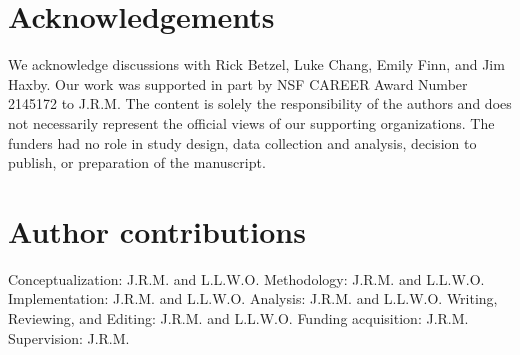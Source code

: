 \documentclass[english, 11pt]{article}
\begin{document}
\section*{Acknowledgements} 

We acknowledge discussions with Rick Betzel, Luke Chang, Emily Finn, and Jim
Haxby. Our work was supported in part by NSF CAREER Award Number 2145172 to
J.R.M. The content is solely the responsibility of the authors and does not
necessarily represent the official views of our supporting organizations. The
funders had no role in study design, data collection and analysis, decision to
publish, or preparation of the manuscript.


\section*{Author contributions} 

Conceptualization: J.R.M. and L.L.W.O. Methodology: J.R.M. and L.L.W.O.
Implementation: J.R.M. and L.L.W.O. Analysis: J.R.M. and L.L.W.O. Writing,
Reviewing, and Editing: J.R.M. and L.L.W.O. Funding acquisition: J.R.M.
Supervision: J.R.M.



\end{document}
